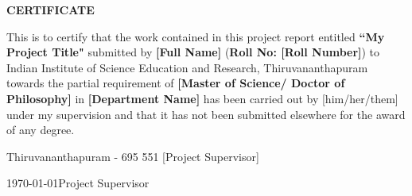 \begin{center}
  {\Large{\bf{CERTIFICATE}}}
\end{center}

\vspace{2em}

This is to certify that the work contained in this project report entitled \textbf{``My Project Title"}  submitted by \textbf{[Full Name]} (\textbf{Roll No: [Roll Number]}) to Indian Institute of Science Education and Research, Thiruvananthapuram towards the partial requirement of {\bf [Master of Science/ Doctor of Philosophy]} in \textbf{[Department Name]} has been carried out by [him/her/them] under my supervision and that it has not been submitted elsewhere for the award of any degree.


\vspace{3em}

\noindent Thiruvananthapuram - 695 551 \hfill [Project Supervisor]

\noindent \today \hfill Project Supervisor

\clearpage
